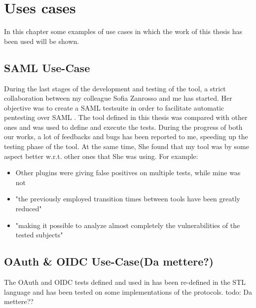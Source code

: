 \chapter{Uses cases}
In this chapter some examples of use cases in which the work of this thesis has been used will be shown.

\section{SAML Use-Case}
During the last stages of the development and testing of the tool, a strict collaboration between my colleague Sofia Zanrosso and me has started. Her objective was to create a SAML testsuite in order to facilitate automatic pentesting over SAML \cite{sofia_zanrosso}. The tool defined in this thesis was compared with other ones and was used to define and execute the tests. During the progress of both our works, a lot of feedbacks and bugs has been reported to me, speeding up the testing phase of the tool. At the same time, She found that my tool was by some aspect better w.r.t. other ones that She was using. For example:
\begin{itemize}
    \item Other plugins were giving false positives on multiple tests, while mine was not
    \item "the previously employed transition times between tools have been greatly reduced"
    \item "making it possible to analyze almost completely the vulnerabilities of the tested subjects"
\end{itemize}


\section{OAuth \& OIDC Use-Case(Da mettere?)}
The \Gls{OAuth} and \Gls{OIDC} tests defined and used in \cite{claudio_grisenti,wendy_barreto} has been re-defined in the STL language and has been tested on some implementations of the protocols.
todo: Da mettere??




